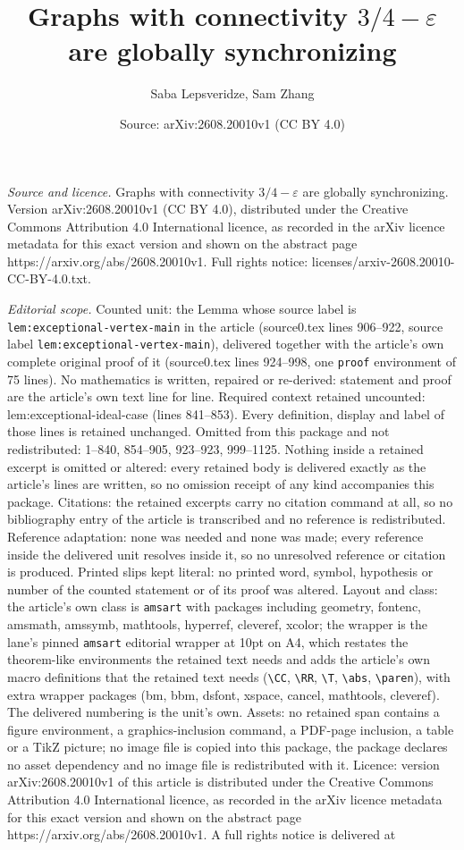\documentclass[10pt,a4paper]{amsart}
\title[Graphs with connectivity $3/4 - \varepsilon$ are globally sy]{Graphs with connectivity $3/4 - \varepsilon$ are globally synchronizing}
\author{Saba Lepsveridze, Sam Zhang}
\date{Source: arXiv:2608.20010v1 (CC BY 4.0)}
\begin{document}
\maketitle

\noindent\emph{Source and licence.} Graphs with connectivity $3/4 - \varepsilon$ are globally synchronizing. Version arXiv:2608.20010v1 (CC BY 4.0), distributed under the Creative Commons Attribution 4.0 International licence, as recorded in the arXiv licence metadata for this exact version and shown on the abstract page https://arxiv.org/abs/2608.20010v1. Full rights notice: licenses/arxiv-2608.20010-CC-BY-4.0.txt.\par\smallskip

\noindent\textit{Editorial scope.} Counted unit: the Lemma whose source label is \texttt{lem:exceptional-vertex-main} in the article (source0.tex lines 906--922, source label \texttt{lem:exceptional-vertex-main}), delivered together with the article's own complete original proof of it (source0.tex lines 924--998, one \texttt{proof} environment of 75 lines). No mathematics is written, repaired or re-derived: statement and proof are the article's own text line for line. Required context retained uncounted: lem:exceptional-ideal-case (lines 841--853). Every definition, display and label of those lines is retained unchanged. Omitted from this package and not redistributed: 1--840, 854--905, 923--923, 999--1125. Nothing inside a retained excerpt is omitted or altered: every retained body is delivered exactly as the article's lines are written, so no omission receipt of any kind accompanies this package. Citations: the retained excerpts carry no citation command at all, so no bibliography entry of the article is transcribed and no reference is redistributed. Reference adaptation: none was needed and none was made; every reference inside the delivered unit resolves inside it, so no unresolved reference or citation is produced. Printed slips kept literal: no printed word, symbol, hypothesis or number of the counted statement or of its proof was altered. Layout and class: the article's own class is \texttt{amsart} with packages including geometry, fontenc, amsmath, amssymb, mathtools, hyperref, cleveref, xcolor; the wrapper is the lane's pinned \texttt{amsart} editorial wrapper at 10pt on A4, which restates the theorem-like environments the retained text needs and adds the article's own macro definitions that the retained text needs (\texttt{\textbackslash CC}, \texttt{\textbackslash RR}, \texttt{\textbackslash T}, \texttt{\textbackslash abs}, \texttt{\textbackslash paren}), with extra wrapper packages (bm, bbm, dsfont, xspace, cancel, mathtools, cleveref). The delivered numbering is the unit's own. Assets: no retained span contains a figure environment, a graphics-inclusion command, a PDF-page inclusion, a table or a TikZ picture; no image file is copied into this package, the package declares no asset dependency and no image file is redistributed with it. Licence: version arXiv:2608.20010v1 of this article is distributed under the Creative Commons Attribution 4.0 International licence, as recorded in the arXiv licence metadata for this exact version and shown on the abstract page https://arxiv.org/abs/2608.20010v1. A full rights notice is delivered at 
\end{document}
